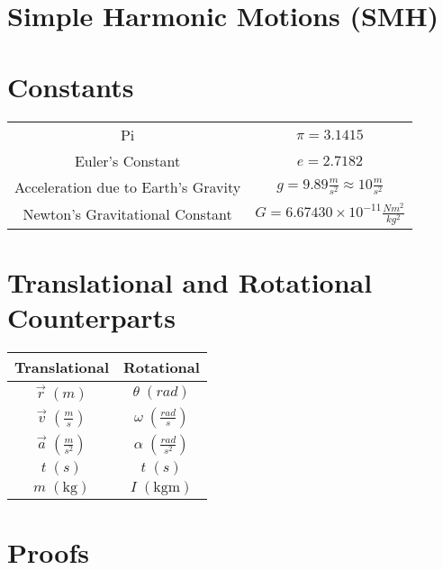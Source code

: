 \documentclass{article}
\newcommand{\unitP}[1]{\; (\mathrm{#1})}
\begin{document}
\newpage

\newpage
\section{Simple Harmonic Motions (SMH)}

\newpage
\appendix

\section{Constants}\label{Appendix A}

\begin{center}
\begin{tabular}{c | c}
    Pi & $\pi = 3.1415$\\
    Euler's Constant & $e = 2.7182$ \\
    Acceleration due to Earth's Gravity & $g = 9.89 \frac{m}{s^2} \approx 10 \frac{m}{s^2}$ \\
    Newton's Gravitational Constant & $G = 6.67430 \times 10^{-11} \frac{Nm^2}{kg^2}$ \\
\end{tabular}
\end{center}

\newpage
\section{Translational and Rotational Counterparts}\label{Appendix B}

\begin{center}
\begin{tabular}{|c | c |}
    \hline
    Translational & Rotational \\
    \hline \hline
    $\vec{r} \; (m)$ & $\theta \; (rad)$ \\
    $\vec{v} \; (\frac{m}{s}) $ & $\omega \; (\frac{rad}{s})$ \\
    $\vec{a} \; (\frac{m}{s^2})$ & $\alpha \; (\frac{rad}{s^2})$ \\
    $t \; (s)$ & $t \; (s)$ \\
    \hline \hline
    $m \; (\mathrm{kg})$ & $I \unitP{kgm}$\\
    \hline
\end{tabular}
\end{center}

\newpage
\section{Proofs}\label{Appendix C}
\end{document}
